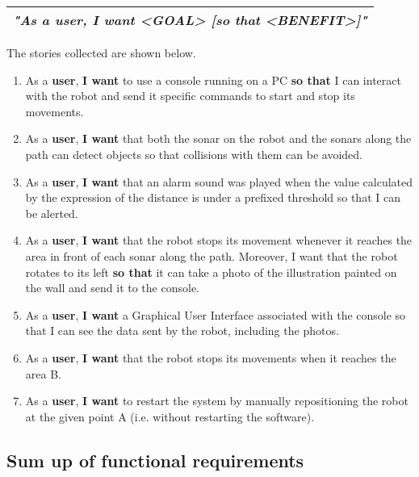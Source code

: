 \documentclass[a4paper]{article}
\begin{document}
\def\arraystretch{1.8}
\begin{table}[h]
\centering
\begin{tabular}{ | m{8.5cm} | }

    \hline
	
	\textit{"As a \textbf{user}, I want <GOAL> [so that <BENEFIT>]"}\\
	
	\hline 

\end{tabular}
\end{table}

The stories collected are shown below.

\begin{enumerate}

	\item As a \textbf{user}, \textbf{I want} to use a console running on a PC \textbf{so that} I can interact with the robot and send it specific commands to start and stop its movements.
	\item As a \textbf{user}, \textbf{I want} that both the sonar on the robot and the sonars along the path can detect objects {so that} collisions with them can be avoided.
	\item As a \textbf{user}, \textbf{I want} that an alarm sound was played when the value calculated by the expression of the distance is under a prefixed threshold {so that} I can be alerted.
	\item As a \textbf{user}, \textbf{I want} that the robot stops its movement whenever it reaches the area in front of each sonar along the path. Moreover, {I want} that the robot rotates to its left \textbf{so that} it can take a photo of the illustration painted on the wall and send it to the console.
	\item As a \textbf{user}, \textbf{I want} a Graphical User Interface associated with the console {so that} I can see the data sent by the robot, including the photos.
	\item As a \textbf{user}, \textbf{I want} that the robot stops its movements when it reaches the area B.
	\item As a \textbf{user}, \textbf{I want} to restart the system by manually repositioning the robot at the given point A (i.e. without restarting the software).
	
\end{enumerate}


\subsection {Sum up of functional requirements}
\end{document}
